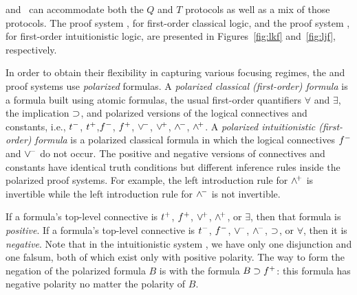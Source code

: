 
\LKF and \LJF ~\cite{LiaMil09}can accommodate both the $Q$ and $T$ protocols as well
as a mix of those protocols.
%
The proof system \LKF, for first-order classical logic, and the
proof system \LJF, for first-order intuitionistic logic, are
presented in Figures~\ref{fig:lkf} and~\ref{fig:ljf}, respectively.

In order to obtain their flexibility in capturing various focusing
regimes, the \LKF and \LJF proof systems use \emph{polarized}
formulas.
%
A \emph{polarized classical (first-order) formula} is a formula built
using atomic formulas, 
the usual first-order quantifiers $\forall$ and $\exists$, the implication
$\supset$, and polarized versions of the logical connectives and
constants, i.e., $t^-$, $t^+$,$f^-$, $f^+$, $\vee^{\!-}$,
$\vee^{\!+}$, $\wedge^{\!-}$, $\wedge^{\!+}$.
%
A \emph{polarized intuitionistic (first-order) formula} is a polarized
classical formula in which the logical connectives $f^-$ and
$\vee^{\!-}$ do not occur.
%
The positive and negative versions of connectives and constants
have identical truth conditions but different inference rules
inside the polarized proof systems.
%
For example, the left introduction rule for $\wedge^{\!+}$ is invertible
while the left introduction rule for $\wedge^{\!-}$ is not invertible.


If a formula's top-level connective is $t^+$,
$f^+$, $\vee^{\!+}$, $\wedge^{\!+}$, or $\exists$, then that formula is
\emph{positive}.
%
If a formula's top-level connective is $t^-$, $f^-$,
$\vee^{\!-}$, $\wedge^{\!-}$, $\supset$, or $\forall$, then it is \emph{negative}.
%
Note that in the intuitionistic system \LJF, we have only one
disjunction and one falsum, both of which exist only with positive
polarity.
%
The way to form the negation of the polarized formula $B$ is with the
formula $B\supset f^+$: this formula has negative polarity no matter
the polarity of $B$.

